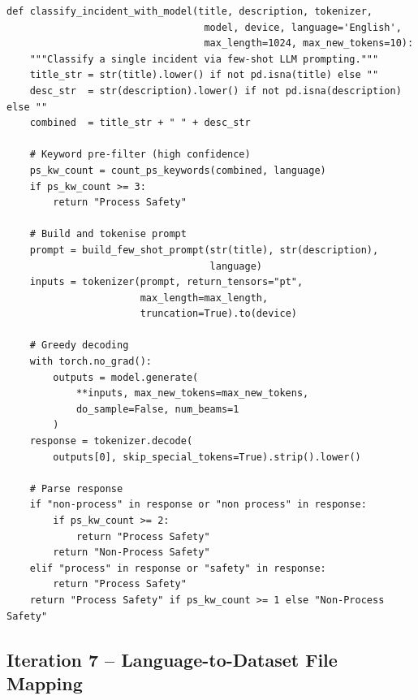\documentclass[11pt, titlepage, bibliography=totoc]{scrreprt}
\begin{document}
\begin{lstlisting}[label=lst:llm-inference,
  caption={Batch LLM inference pipeline for Iteration~7, using greedy decoding and a keyword-based fallback on model errors.}]
def classify_incident_with_model(title, description, tokenizer,
                                  model, device, language='English',
                                  max_length=1024, max_new_tokens=10):
    """Classify a single incident via few-shot LLM prompting."""
    title_str = str(title).lower() if not pd.isna(title) else ""
    desc_str  = str(description).lower() if not pd.isna(description) else ""
    combined  = title_str + " " + desc_str

    # Keyword pre-filter (high confidence)
    ps_kw_count = count_ps_keywords(combined, language)
    if ps_kw_count >= 3:
        return "Process Safety"

    # Build and tokenise prompt
    prompt = build_few_shot_prompt(str(title), str(description),
                                   language)
    inputs = tokenizer(prompt, return_tensors="pt",
                       max_length=max_length,
                       truncation=True).to(device)

    # Greedy decoding
    with torch.no_grad():
        outputs = model.generate(
            **inputs, max_new_tokens=max_new_tokens,
            do_sample=False, num_beams=1
        )
    response = tokenizer.decode(
        outputs[0], skip_special_tokens=True).strip().lower()

    # Parse response
    if "non-process" in response or "non process" in response:
        if ps_kw_count >= 2:
            return "Process Safety"
        return "Non-Process Safety"
    elif "process" in response or "safety" in response:
        return "Process Safety"
    return "Process Safety" if ps_kw_count >= 1 else "Non-Process Safety"
\end{lstlisting}

\subsection*{Iteration 7 -- Language-to-Dataset File Mapping}
\end{document}
